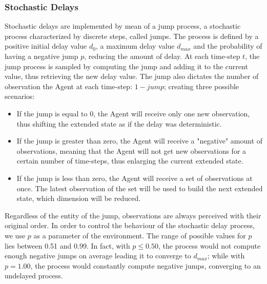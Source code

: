             \subsubsection{Stochastic Delays}
                Stochastic delays are implemented by mean of a jump process, a stochastic process characterized by discrete steps, called jumps. The process is defined by a positive initial delay value $d_0$, a maximum delay value $d_{max}$ and the probability of having a negative jump $p$, reducing the amount of delay. At each time-step $t$, the jump process is sampled by computing the jump and adding it to the current value, thus retrieving the new delay value. The jump also dictates the number of observation the Agent at each time-step: $1-jump$; creating three possible scenarios:
                \begin{itemize}
                    \item If the jump is equal to 0, the Agent will receive only one new observation, thus shifting the extended state as if the delay was deterministic.
                    \item If the jump is greater than zero, the Agent will receive a "negative" amount of observations, meaning that the Agent will not get new observations for a certain number of time-steps, thus enlarging the current extended state.
                    \item If the jump is less than zero, the Agent will receive a set of observations at once. The latest observation of the set will be used to build the next extended state, which dimension will be reduced. 
                \end{itemize}
                Regardless of the entity of the jump, observations are always perceived with their original order. In order to control the behaviour of the stochastic delay process, we use $p$ as a parameter of the environment. The range of possible values for $p$ lies between 0.51 and 0.99. In fact, with $p \leq 0.50$, the process would not compute enough negative jumps on average leading it to converge to $d_{max}$; while with $p = 1.00$, the process would constantly compute negative jumps, converging to an undelayed process. 
                
